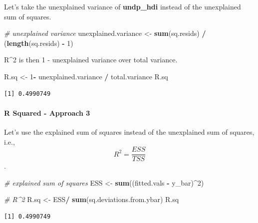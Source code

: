 \documentclass[]{article}
\newenvironment{Shaded}{\begin{snugshade}}{\end{snugshade}}
\newcommand{\KeywordTok}[1]{\textcolor[rgb]{0.13,0.29,0.53}{\textbf{#1}}}
\newcommand{\DecValTok}[1]{\textcolor[rgb]{0.00,0.00,0.81}{#1}}
\newcommand{\StringTok}[1]{\textcolor[rgb]{0.31,0.60,0.02}{#1}}
\newcommand{\CommentTok}[1]{\textcolor[rgb]{0.56,0.35,0.01}{\textit{#1}}}
\newcommand{\OperatorTok}[1]{\textcolor[rgb]{0.81,0.36,0.00}{\textbf{#1}}}
\newcommand{\NormalTok}[1]{#1}
\let\oldparagraph\paragraph
\renewcommand{\paragraph}[1]{\oldparagraph{#1}\mbox{}}
\theoremstyle{definition}
\theoremstyle{definition}
\theoremstyle{definition}
\theoremstyle{remark}
\begin{document}
Let's take the unexplained variance of \textbf{undp\_hdi} instead of the
unexplained sum of squares.

\begin{Shaded}
\begin{Highlighting}[]
\CommentTok{# unexplained variance}
\NormalTok{unexplained.variance <-}\StringTok{ }\KeywordTok{sum}\NormalTok{(sq.resids) }\OperatorTok{/}\StringTok{ }\NormalTok{(}\KeywordTok{length}\NormalTok{(sq.resids) }\OperatorTok{-}\StringTok{ }\DecValTok{1}\NormalTok{)}
\end{Highlighting}
\end{Shaded}

R\^{}2 is then 1 - unexplained variance over total variance.

\begin{Shaded}
\begin{Highlighting}[]
\NormalTok{R.sq <-}\StringTok{ }\DecValTok{1}\OperatorTok{-}\StringTok{ }\NormalTok{unexplained.variance }\OperatorTok{/}\StringTok{ }\NormalTok{total.variance}
\NormalTok{R.sq}
\end{Highlighting}
\end{Shaded}

\begin{verbatim}
[1] 0.4990749
\end{verbatim}

\paragraph{R Squared - Approach 3}\label{r-squared---approach-3}

Let's use the explained sum of squares instead of the unexplained sum of
squares, i.e., \[R^2 = \frac{ESS}{TSS}\].

\begin{Shaded}
\begin{Highlighting}[]
\CommentTok{# explained sum of squares}
\NormalTok{ESS <-}\StringTok{ }\KeywordTok{sum}\NormalTok{((fitted.vals }\OperatorTok{-}\StringTok{ }\NormalTok{y_bar)}\OperatorTok{^}\DecValTok{2}\NormalTok{)}

\CommentTok{# R^2}
\NormalTok{R.sq <-}\StringTok{ }\NormalTok{ESS}\OperatorTok{/}\StringTok{ }\KeywordTok{sum}\NormalTok{(sq.deviations.from.ybar)}
\NormalTok{R.sq}
\end{Highlighting}
\end{Shaded}

\begin{verbatim}
[1] 0.4990749
\end{verbatim}
\end{document}
